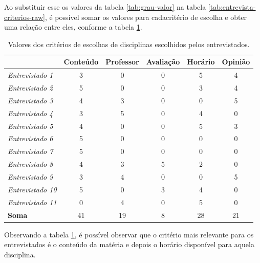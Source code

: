Ao substituir esse os valores da tabela \ref{tab:grau-valor} na tabela \ref{tab:entrevista-criterios-raw}, é possível somar os valores para cadacritério de escolha e obter uma relação entre eles, conforme a tabela \ref{tab:entrevista-criterios-valor}.

\begin{table}[!ht]
    \begin{center}
        \begin{tabular}{ l|c|c|c|c|c } 
            & Conteúdo & Professor & Avaliação & Horário & Opinião \\ 
            \hline 
            \textit{Entrevistado 1 } & 3 & 0 & 0 & 5 & 4 \\     %
            \textit{Entrevistado 2 } & 5 & 0 & 0 & 3 & 4 \\     %
            \textit{Entrevistado 3 } & 4 & 3 & 0 & 0 & 5 \\     %
            \textit{Entrevistado 4 } & 3 & 5 & 0 & 4 & 0 \\     %
            \textit{Entrevistado 5 } & 4 & 0 & 0 & 5 & 3 \\     %
            \textit{Entrevistado 6 } & 5 & 0 & 0 & 0 & 0 \\     %
            \textit{Entrevistado 7 } & 5 & 0 & 0 & 0 & 0 \\     %
            \textit{Entrevistado 8 } & 4 & 3 & 5 & 2 & 0 \\     %
            \textit{Entrevistado 9 } & 3 & 4 & 0 & 0 & 5 \\     %
            \textit{Entrevistado 10} & 5 & 0 & 3 & 4 & 0 \\     %
            \textit{Entrevistado 11} & 0 & 4 & 0 & 5 & 0 \\     %
            \hline
            \textbf{Soma}            & 41& 19& 8 & 28& 21 
        \end{tabular}
    \end{center}
    \caption{Valores dos critérios de escolhas de disciplinas escolhidos pelos entrevistados.}
    \label{tab:entrevista-criterios-valor}
\end{table}

Observando a tabela \ref{tab:entrevista-criterios-valor}, é possível observar que o critério mais relevante para os entrevistados é o conteúdo da matéria e depois o horário disponível para aquela disciplina. 

